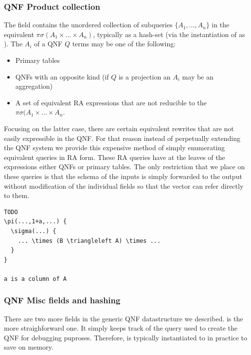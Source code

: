 \subsubsection{QNF Product collection}

The  field contains the
unordered collection of subqueries \(\{A_1,... , A_n\}\) in the
equivalent \(\pi \sigma (A_1 \times ... \times A_n)\), typically as a
hash-set (via the instantiation of  as
). The \(A_i\) of a QNF \(Q\) terms may be one of the
following:

\begin{itemize}
\item Primary tables
\item QNFs with an opposite kind  (if \(Q\) is a projection an
  \(A_i\) may be an aggregation)
\item A set of equivalent RA expressions that are not reducible to the
  \(\pi \sigma(A_1 \times ... \times A_n\).
\end{itemize}

Focusing on the latter case, there are certain equivalent rewrites
that are not easily expressible in the QNF. For that reason instead of
perpetually extending the QNF system we provide this expensive method
of simply enumerating equivalent queries in RA form. These RA queries
have at the leaves of the expressions either QNFs or primary
tables. The only restriction that we place on these queries is that
the schema of the inputs is simply forwarded to the output without
modification of the individual fields so that the  vector can
refer directly to them.

\begin{verbatim}
TODO
\pi(...,1+a,...) {
  \sigma(...) {
    ... \times (B \triangleleft A) \times ...
  }
}

a is a column of A
\end{verbatim}


\subsubsection{QNF Misc fields and hashing}

There are two more fields in the generic QNF datastructure we
described.  is the more
straighforward one. It simply keeps track of the query used to create
the QNF for debugging puproses. Therefore,  is typically
instantiated to  in practice to save on memory.

